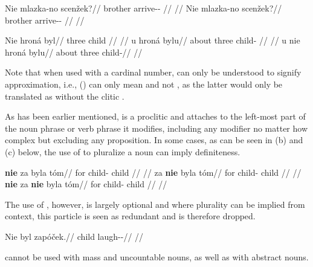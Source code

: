 \pex
\begingl
    \gla Nie mlazka-no scenžek?//
    \glb {} brother arrive-\Av{}-\Pf{} //
    \glft {}//
\endgl
\xe
\pex
\begingl
    \gla Nie mlazka-no scenžek?//
    \glb {} brother arrive-\Av{}-\Pf{} //
    \glft {}//
\endgl
\xe

\pex
\a
\begingl{}
    \gla Nie hroná byl//
    \glb {} three child //
    \glft {}//
\endgl
\a
\begingl
    \gla u hroná bylu//
    \glb about three child-\Ins{} //
    \glft {}//
\endgl
\a
\begingl
    \gla u nie hroná bylu//
    \glb about  three child-\Ins{}//
    \glft {}//
\endgl
\xe

Note that when used with a cardinal number,  can only be understood to signify approximation, i.e., () can only mean  and not , as the latter would only be translated as  without the clitic .

As has been earlier mentioned,  is a proclitic and attaches to the left-most part of the noun phrase or verb phrase it modifies, including any modifier no matter how complex but excluding any proposition. In some cases, as can be seen in (b) and (c) below, the use of  to pluralize a noun can imply definiteness.

\pex
\a
\begingl{}
    \gla \textbf{nie} za byla tóm//
    \glb {} for child-\Pat{} child //
    \glft {}//
\endgl
\a
\begingl{}
    \gla za \textbf{nie} byla tóm//
    \glb for  child-\Pat{} child //
    \glft {}//
\endgl
\a
\begingl{}
    \gla \textbf{nie} za \textbf{nie} byla tóm//
    \glb {} for  child-\Pat{} child //
    \glft {}//
\endgl
\xe





The use of , however, is largely optional and where plurality can be implied from context, this particle is seen as redundant and is therefore dropped.

\pex
\begingl
\gla Nie byl zapóček.//
\glb {} child laugh-\Av{}-\Pf{}//
\glft {}//
\endgl
\xe

 cannot be used with mass and uncountable nouns, as well as with abstract nouns.

